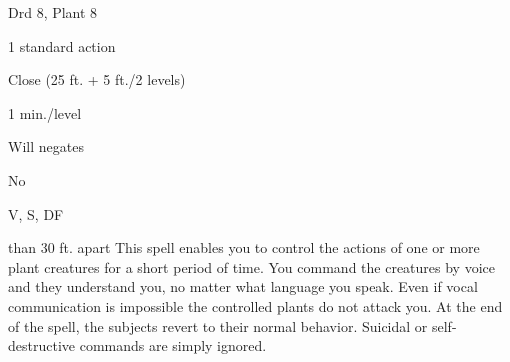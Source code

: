 
\begin{description*}
\item[Level:] Drd 8, Plant 8
\item[Casting Time:] 1 standard action
\item[Range:] Close (25 ft. + 5 ft./2 levels)
\item[Duration:] 1 min./level
\item[Saving Throw:] Will negates
\item[Spell Resistance:] No
\item[Components:] V, S, DF
\end{description*}

than 30 ft. apart
This spell enables you to control the actions of one or more plant creatures for
a short period of time. You command the creatures by voice and they understand
you, no matter what language you speak. Even if vocal communication is impossible
the controlled plants do not attack you. At the end of the spell, the subjects
revert to their normal behavior.
Suicidal or self-destructive commands are simply ignored.